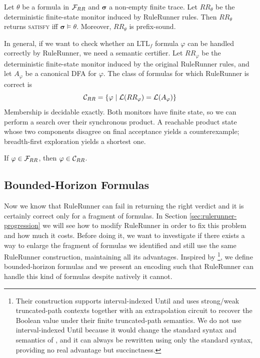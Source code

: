 \begin{theorem}
\label{thm:rulerunner-correct}
Let $\theta$ be a formula in ${\mathcal{F}}_{RR}$ and $\boldsymbol{\sigma}$ a non-empty
finite trace. Let $RR_\theta$ be the deterministic finite-state monitor induced
by RuleRunner rules. Then $RR_\theta$ returns \textsc{satisfy} iff
$\boldsymbol{\sigma}\models\theta$. Moreover, $RR_\theta$ is prefix-sound.
\end{theorem}


In general, if we want to check whether an LTL$_f$ formula $\varphi$ can be handled correctly by RuleRunner, we need a semantic certifier.  Let $RR_\varphi$ be the deterministic finite-state monitor induced by the original RuleRunner rules, and let $A_\varphi$ be a canonical DFA for $\varphi$. The class of formulas for which RuleRunner is correct is
\[
{\mathcal{C}}_{RR} = \{\varphi \mid {\ensuremath{\mathcal{L}}}(RR_\varphi) = {\mathcal{L}}(A_\varphi)\}
\]
Membership is decidable exactly. Both monitors have finite state, so we can perform a search over their synchronous product. A reachable product state whose two components disagree on final acceptance yields a counterexample; breadth-first exploration yields a shortest one.

\begin{corollary}
\label{cor:rulerunner-certifier}
If $\varphi \in {\ensuremath{\mathcal{F}}}_{RR}$, then $\varphi \in {\ensuremath{\mathcal{C}}}_{RR}$.
\end{corollary}


\subsection{Bounded-Horizon Formulas}
\label{sec:rulerunner-bounded}

Now we know that RuleRunner can fail in returning the right verdict and it is certainly correct only for a fragment of \ltlf formulas. In Section \ref{sec:rulerunner-progression} we will see how to modify RuleRunner in order to fix this problem and how much it costs. Before doing it, we want to investigate if there exists a way to enlarge the fragment of formulas we identified and still use the same RuleRunner construction, maintaining all its advantages. Inspired by \cite{finkbeiner2009monitor}\footnote{Their construction supports interval-indexed Until and uses strong/weak truncated-path contexts together with an extrapolation circuit to recover the Boolean value under their finite truncated-path semantics. We do not use interval-indexed Until because it would change the standard syntax and semantics of \ltlf, and it can always be rewritten using only the standard syntax, providing no real advantage but succinctness.}, we define bounded-horizon formulas and we present an encoding such that RuleRunner can handle this kind of formulas despite natively it cannot.


